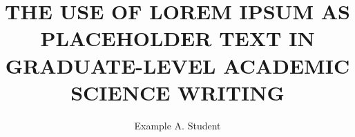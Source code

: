 \documentclass[12pt]{rowanthesis}
\title{THE USE OF LOREM IPSUM AS PLACEHOLDER TEXT IN GRADUATE-LEVEL ACADEMIC SCIENCE WRITING}
\author{Example A. Student}
\begin{document}
\makeTitlePage



\begin{frontmatter}
    
    
    \buildAbstract
    
    \buildTOC
    \buildListOfFigures
    \buildListOfTables   
    \buildListOfSchemes
\end{frontmatter}

\begin{thesisbody}
    
    
    
    \buildBibliography
    
    
    
\end{thesisbody}
\end{document}
